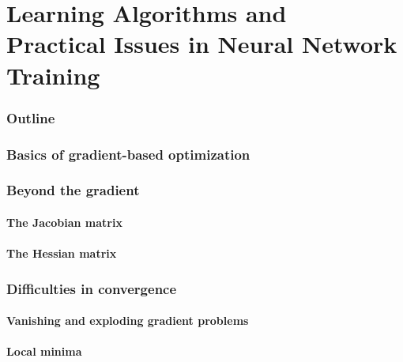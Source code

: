 \renewcommand{\thispart}{4 }
\renewcommand{\thispartname}{
    Learning Algorithms and\\ 
    Practical Issues in Neural Network Training}

\part{\thispartname}

\section{Outline}






\section{Basics of gradient-based optimization}

\section{Beyond the gradient}
\subsection{The Jacobian matrix}

\subsection{The Hessian matrix}


\section{Difficulties in convergence}

\subsection{Vanishing and exploding gradient problems}

\subsection{Local minima}


